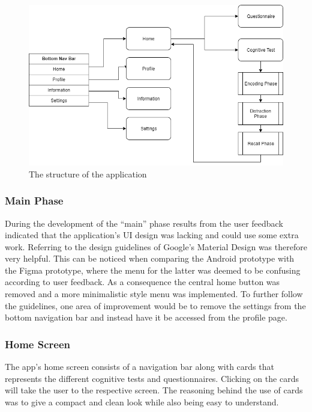 \documentclass{article}
\begin{document}
\begin{figure}[!h]
  \begin{center}
    \includegraphics[scale=0.5]{AppDiagram.png}
    \caption{The structure of the application
}
    \label{fig:appDiagram}
  \end{center}
\end{figure}

\subsubsection{Main Phase}
During the development of the “main” phase results from the user feedback indicated that the application's UI design was lacking and could use some extra work. Referring to the design guidelines of Google’s Material Design was therefore very helpful.\cite{noauthor_material_nodate} This can be noticed when comparing the Android prototype with the Figma prototype, where the menu for the latter was deemed to be confusing according to user feedback. As a consequence the central home button was removed and a more minimalistic style menu was implemented. To further follow the guidelines, one area of improvement would be to remove the settings from the bottom navigation bar and instead have it be accessed from the profile page.

\subsubsection{Home Screen}
The app’s home screen consists of a navigation bar along with cards that represents the different cognitive tests and questionnaires. Clicking on the cards will take the user to the respective screen. The reasoning behind the use of cards was to give a compact and clean look while also being easy to understand.
\end{document}
